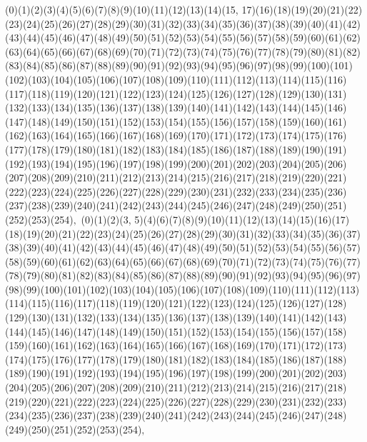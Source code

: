 \documentclass[12pt]{article}
\begin{document}
{(0)(1)(2)(3)(4)(5)(6)(7)(8)(9)(10)(11)(12)(13)(14)(15, 17)(16)(18)(19)(20)(21)(22)(23)(24)(25)(26)(27)(28)(29)(30)(31)(32)(33)(34)(35)(36)(37)(38)(39)(40)(41)(42)(43)(44)(45)(46)(47)(48)(49)(50)(51)(52)(53)(54)(55)(56)(57)(58)(59)(60)(61)(62)(63)(64)(65)(66)(67)(68)(69)(70)(71)(72)(73)(74)(75)(76)(77)(78)(79)(80)(81)(82)(83)(84)(85)(86)(87)(88)(89)(90)(91)(92)(93)(94)(95)(96)(97)(98)(99)(100)(101)(102)(103)(104)(105)(106)(107)(108)(109)(110)(111)(112)(113)(114)(115)(116)(117)(118)(119)(120)(121)(122)(123)(124)(125)(126)(127)(128)(129)(130)(131)(132)(133)(134)(135)(136)(137)(138)(139)(140)(141)(142)(143)(144)(145)(146)(147)(148)(149)(150)(151)(152)(153)(154)(155)(156)(157)(158)(159)(160)(161)(162)(163)(164)(165)(166)(167)(168)(169)(170)(171)(172)(173)(174)(175)(176)(177)(178)(179)(180)(181)(182)(183)(184)(185)(186)(187)(188)(189)(190)(191)(192)(193)(194)(195)(196)(197)(198)(199)(200)(201)(202)(203)(204)(205)(206)(207)(208)(209)(210)(211)(212)(213)(214)(215)(216)(217)(218)(219)(220)(221)(222)(223)(224)(225)(226)(227)(228)(229)(230)(231)(232)(233)(234)(235)(236)(237)(238)(239)(240)(241)(242)(243)(244)(245)(246)(247)(248)(249)(250)(251)(252)(253)(254)$
, 
$
(0)(1)(2)(3, 5)(4)(6)(7)(8)(9)(10)(11)(12)(13)(14)(15)(16)(17)(18)(19)(20)(21)(22)(23)(24)(25)(26)(27)(28)(29)(30)(31)(32)(33)(34)(35)(36)(37)(38)(39)(40)(41)(42)(43)(44)(45)(46)(47)(48)(49)(50)(51)(52)(53)(54)(55)(56)(57)(58)(59)(60)(61)(62)(63)(64)(65)(66)(67)(68)(69)(70)(71)(72)(73)(74)(75)(76)(77)(78)(79)(80)(81)(82)(83)(84)(85)(86)(87)(88)(89)(90)(91)(92)(93)(94)(95)(96)(97)(98)(99)(100)(101)(102)(103)(104)(105)(106)(107)(108)(109)(110)(111)(112)(113)(114)(115)(116)(117)(118)(119)(120)(121)(122)(123)(124)(125)(126)(127)(128)(129)(130)(131)(132)(133)(134)(135)(136)(137)(138)(139)(140)(141)(142)(143)(144)(145)(146)(147)(148)(149)(150)(151)(152)(153)(154)(155)(156)(157)(158)(159)(160)(161)(162)(163)(164)(165)(166)(167)(168)(169)(170)(171)(172)(173)(174)(175)(176)(177)(178)(179)(180)(181)(182)(183)(184)(185)(186)(187)(188)(189)(190)(191)(192)(193)(194)(195)(196)(197)(198)(199)(200)(201)(202)(203)(204)(205)(206)(207)(208)(209)(210)(211)(212)(213)(214)(215)(216)(217)(218)(219)(220)(221)(222)(223)(224)(225)(226)(227)(228)(229)(230)(231)(232)(233)(234)(235)(236)(237)(238)(239)(240)(241)(242)(243)(244)(245)(246)(247)(248)(249)(250)(251)(252)(253)(254)$
, 
$
}
\end{document}

